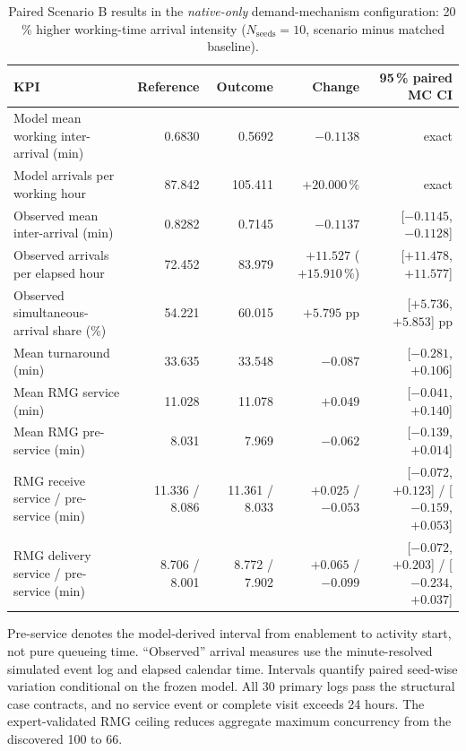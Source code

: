 \begin{table}[htbp]
\centering
\footnotesize
\setlength{\tabcolsep}{3.0pt}
\begin{tabularx}{\textwidth}{@{}Xrrrr@{}}
\toprule
\textbf{KPI} & \textbf{Reference} & \textbf{Outcome} & \textbf{Change} & \textbf{95\,\% paired MC CI} \\
\midrule
Model mean working inter-arrival (min) & 0.6830 & 0.5692 & $-0.1138$ & exact \\
Model arrivals per working hour & 87.842 & 105.411 & $+20.000\,\%$ & exact \\
Observed mean inter-arrival (min) & 0.8282 & 0.7145 & $-0.1137$ & [$-0.1145$, $-0.1128$] \\
Observed arrivals per elapsed hour & 72.452 & 83.979 & $+11.527$ ($+15.910\,\%$) & [$+11.478$, $+11.577$] \\
Observed simultaneous-arrival share (\%) & 54.221 & 60.015 & $+5.795$ pp & [$+5.736$, $+5.853$] pp \\
Mean turnaround (min) & 33.635 & 33.548 & $-0.087$ & [$-0.281$, $+0.106$] \\
Mean RMG service (min) & 11.028 & 11.078 & $+0.049$ & [$-0.041$, $+0.140$] \\
Mean RMG pre-service (min) & 8.031 & 7.969 & $-0.062$ & [$-0.139$, $+0.014$] \\
RMG receive service / pre-service (min) & 11.336 / 8.086 & 11.361 / 8.033 & $+0.025$ / $-0.053$ & [$-0.072$, $+0.123$] / [$-0.159$, $+0.053$] \\
RMG delivery service / pre-service (min) & 8.706 / 8.001 & 8.772 / 7.902 & $+0.065$ / $-0.099$ & [$-0.072$, $+0.203$] / [$-0.234$, $+0.037$] \\
\bottomrule
\end{tabularx}
\caption{Paired Scenario B results in the \textit{native-only} demand-mechanism
configuration:
20\,\% higher working-time arrival intensity
($N_{\text{seeds}}=10$, scenario minus matched baseline).}
\label{tab:demand_scenario_kpis}
\smallskip
\parbox{0.97\textwidth}{\scriptsize Pre-service denotes the model-derived
interval from enablement to activity start, not pure queueing time.
``Observed'' arrival measures use the minute-resolved simulated event log and
elapsed calendar time. Intervals quantify paired seed-wise variation
conditional on the frozen model. All 30 primary logs pass the structural case
contracts, and no service event or complete visit exceeds 24 hours. The
expert-validated RMG ceiling reduces aggregate maximum concurrency from the
discovered 100 to 66.}
\end{table}

